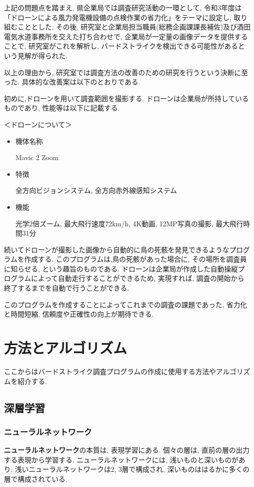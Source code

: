 \documentclass[dvipdfmx]{jsarticle}
\begin{document}
上記の問題点を踏まえ, 県企業局では調査研究活動の一環として, 令和3年度は「ドローンによる風力発電機設備の点検作業の省力化」をテーマに設定し, 取り組むこととした.
その後, 研究室と企業局担当職員(総務企画課課長補佐)及び酒田電気水道事務所を交えた打ち合わせで, 企業局が一定量の画像データを提供することで, 研究室がこれを解析し, バードストライクを検出できる可能性があるという見解が得られた.



以上の理由から, 研究室では調査方法の改善のための研究を行うという決断に至った.
具体的な改善案は以下のとおりである.

初めに,ドローンを用いて調査範囲を撮影する.
ドローンは企業局が所持しているものであり, 性能等は以下に記載する.

＜ドローンについて＞
\begin{itemize}
    \item 機体名称

    Mavic 2 Zoom

    \item 特徴

    全方向ビジョンシステム, 全方向赤外線感知システム

    \item 機能

    光学2倍ズーム, 最大飛行速度72km/h, 4K動画, 12MP写真の撮影, 最大飛行時間31分
\end{itemize}

続いてドローンが撮影した画像から自動的に鳥の死骸を発見できるようなプログラムを作成する. このプログラムは,鳥の死骸があった場合に, その場所を調査員に知らせる, という趣旨のものである.
ドローンは企業局が作成した自動操縦プログラムによって自動走行することができるため, 実現すれば, 調査の開始から終了するまでを自動で行うことができる.

このプログラムを作成することによってこれまでの調査の課題であった, 省力化と時間短縮, 信頼度や正確性の向上が期待できる.

\section{方法とアルゴリズム}
ここからはバードストライク調査プログラムの作成に使用する方法やアルゴリズムを紹介する.
\subsection{深層学習}
\subsubsection{ニューラルネットワーク}
\textbf{ニューラルネットワーク}の本質は, 表現学習にある.
個々の層は, 直前の層の出力する表現から学習する.
ニューラルネットワークには, 浅いものと深いものがあり, 浅いニューラルネットワークは2, 3層で構成され, 深いものははるかに多くの層で構成されている.
\end{document}
